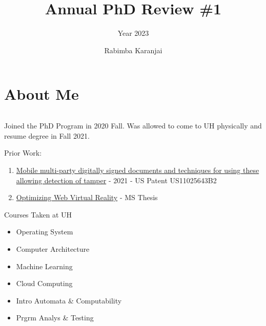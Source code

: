 \documentclass[10pt,aspectratio=169]{beamer}
\title{Annual PhD Review \#1}
\subtitle{Year 2023}
\author{Rabimba Karanjai}
\begin{document}
\sloppy

\maketitle

\section[fragile]{About Me}
\begin{frame}
\begin{columns}
\begin{column}{0.7\textwidth}
Joined the PhD Program in 2020 Fall. Was allowed to come to UH physically and resume degree in Fall 2021.
\begin{block}{Prior Work:}
\begin{enumerate}
\item \href{https://patents.google.com/patent/US11025643B2/en?q=(rabimba)&oq=rabimba}{Mobile multi-party digitally signed documents and techniques for using these allowing detection of tamper} - {2021} - {US Patent US11025643B2}
\item \href{https://scholarship.rice.edu/handle/1911/105623}{Optimizing Web Virtual Reality} - {MS Thesis}
\end{enumerate}
\end{block}
\begin{block}{Courses Taken at UH}
\begin{itemize}
\item Operating System
\item Computer Architecture
\item Machine Learning
\item Cloud Computing
\item Intro Automata \& Computability
\item Prgrm Analys \& Testing
\end{itemize}
\end{block}


\end{column}
\end{columns}
\end{frame}
\end{document}

